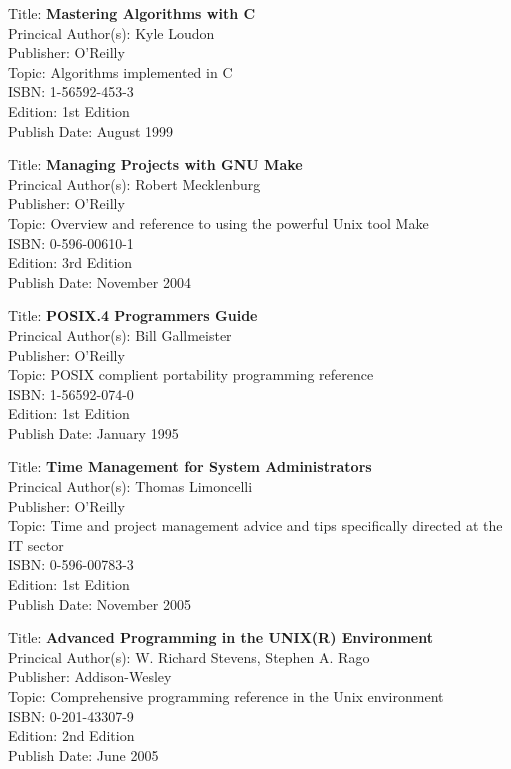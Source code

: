 Title: 	\textbf{Mastering Algorithms with C}	\\
Princical Author(s): 	Kyle Loudon  \\
Publisher:	O'Reilly	\\	
Topic:		Algorithms implemented in C \\
ISBN:			1-56592-453-3 \\
Edition:		1st Edition \\
Publish Date:		August 1999


Title: 	\textbf{Managing Projects with GNU Make}	\\
Princical Author(s): 	Robert Mecklenburg  \\
Publisher:	O'Reilly	\\	
Topic:		Overview and reference to using the powerful Unix tool Make \\
ISBN:			0-596-00610-1 \\
Edition:		3rd Edition \\
Publish Date:		November 2004

	
Title: 	\textbf{POSIX.4 Programmers Guide}	\\
Princical Author(s): 	Bill Gallmeister  \\
Publisher:	O'Reilly	\\	
Topic:		POSIX complient portability programming reference \\
ISBN:			1-56592-074-0 \\
Edition:		1st Edition \\
Publish Date:		January 1995

	
Title: 	\textbf{Time Management for System Administrators}	\\
Princical Author(s): 	Thomas Limoncelli  \\
Publisher:	O'Reilly	\\	
Topic:		Time and project management advice and tips specifically directed at the IT sector \\
ISBN:			0-596-00783-3 \\
Edition:		1st Edition \\
Publish Date:		November 2005

	
Title: 	\textbf{Advanced Programming in the UNIX(R) Environment}	\\
Princical Author(s): 	W. Richard Stevens, Stephen A. Rago  \\
Publisher:	Addison-Wesley	\\	
Topic:		Comprehensive programming reference in the Unix environment \\
ISBN:			0-201-43307-9 \\
Edition:		2nd Edition \\
Publish Date:		June 2005


